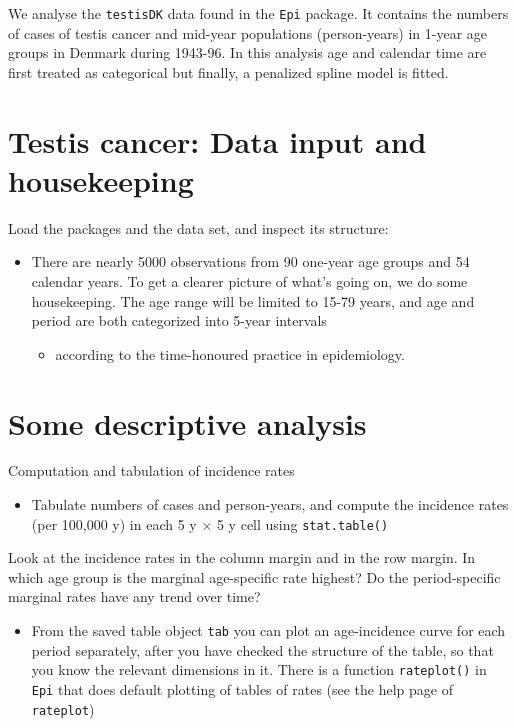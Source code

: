\documentclass[
]{book}
\providecommand{\tightlist}{%
  \setlength{\itemsep}{0pt}\setlength{\parskip}{0pt}}
\begin{document}
We analyse the \texttt{testisDK} data found in the
\texttt{Epi} package.
It contains the numbers of cases of testis cancer and mid-year
populations (person-years) in 1-year age groups in Denmark during
1943-96. In this analysis age and calendar time
are first treated as categorical
but finally, a penalized spline model is fitted.

\section{Testis cancer: Data input and housekeeping}\label{testis-cancer-data-input-and-housekeeping}

Load the packages and the data set, and inspect its structure:

\begin{itemize}
\tightlist
\item
  There are nearly 5000 observations from 90 one-year age groups
  and 54 calendar years. To get a clearer picture of what's going on,
  we do some housekeeping. The age range will be limited to 15-79
  years, and age and period are both categorized into 5-year intervals

  \begin{itemize}
  \tightlist
  \item
    according to the time-honoured practice in epidemiology.
  \end{itemize}
\end{itemize}

\section{Some descriptive analysis}\label{some-descriptive-analysis}

Computation and tabulation of incidence rates

\begin{itemize}
\tightlist
\item
  Tabulate numbers of cases and person-years, and compute the
  incidence rates (per 100,000 y) in each 5 y \(\times\) 5 y cell using
  \texttt{stat.table()}
\end{itemize}

Look at the incidence rates in the column margin and in the row
margin. In which age group is the marginal age-specific rate highest?
Do the period-specific marginal rates have any trend over time?

\begin{itemize}
\tightlist
\item
  From the saved table object \texttt{tab} you can plot an
  age-incidence curve for each period separately, after you have
  checked the structure of the table, so that you know the relevant
  dimensions in it. There is a function \texttt{rateplot()} in \texttt{Epi}
  that does default plotting of tables of rates (see the help page of
  \texttt{rateplot})
\end{itemize}
\end{document}
